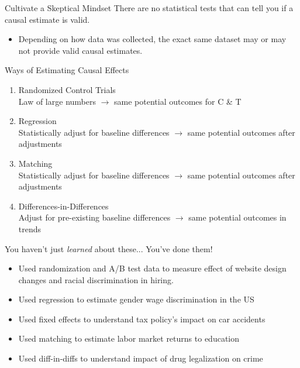 \documentclass[11pt]{beamer}
\begin{document}
\begin{frame}[c]{Cultivate a Skeptical Mindset}
    \pause There are \alert{no statistical tests} that can tell you if a causal estimate is valid. 
    \begin{itemize}
        \pause \item Depending on \alert{how} data was collected, the exact same dataset may or may not provide valid causal estimates.
    \end{itemize}
    \end{frame}
    
\begin{frame}[c]{Ways of Estimating Causal Effects}
    \begin{enumerate}
      \pause \item Randomized Control Trials \\
      {\color{gray} Law of large numbers $\rightarrow$ same potential outcomes for C \& T}
      \pause \item Regression \\
      {\color{gray} Statistically adjust for baseline differences $\rightarrow$ same potential outcomes after adjustments}
      \pause \item Matching \\
      {\color{gray} Statistically adjust for baseline differences $\rightarrow$ same potential outcomes after adjustments}
      \pause \item Differences-in-Differences \\
      {\color{gray} Adjust for pre-existing baseline differences $\rightarrow$ same potential outcomes in trends}
    \end{enumerate}
\end{frame}


\begin{frame}[t]{You haven't just \emph{learned} about these...}
    \pause You've done them!
    \begin{itemize}
        \pause \item  Used randomization and A/B test data to measure effect of website design changes and racial discrimination in hiring.
        \pause \item  Used regression to estimate gender wage discrimination in the US
        \pause \item  Used fixed effects to understand tax policy's impact on car accidents
        \pause \item  Used matching to estimate labor market returns to education
        \pause \item  Used diff-in-diffs to understand impact of drug legalization on crime
    \end{itemize}
\end{frame}
\end{document}
